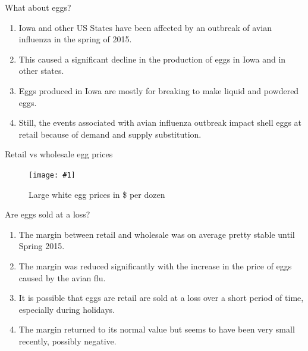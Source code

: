 \documentclass[table,xcolor=pdftex,dvipsnames, handout]{beamer}\usepackage[]{graphicx}\usepackage[]{color}
\newcommand {\framedgraphic}[1] {
        \begin{center}
            \texttt{[image: \#1]}
        \end{center}
        \vspace{-1\baselineskip}
}
\begin{document}

\begin{frame}{What about eggs?}
\begin{enumerate}[label=\textbullet]
  \item Iowa and other US States have been affected by an outbreak of avian influenza in the spring of 2015.
  \item This caused a significant decline in the production of eggs in Iowa and in other states.
  \item Eggs produced in Iowa are mostly for breaking to make liquid and powdered eggs.
  \item Still, the events associated with avian influenza outbreak impact shell eggs at retail because of demand and supply substitution.
\end{enumerate}
\end{frame}


\begin{frame}{Retail vs wholesale egg prices}
\begin{figure}[htbp]
\caption{Large white egg prices in \$ per dozen}
    \framedgraphic{Egg_retail_wholesale.png}
\end{figure}
\end{frame}


\begin{frame}{Are eggs sold at a loss?}
\begin{enumerate}[label=\textbullet]
  \item The margin between retail and wholesale was on average pretty stable until Spring 2015.
  \item The margin was reduced significantly with the increase in the price of eggs caused by the avian flu.
  \item It is possible that eggs are retail are sold at a loss over a short period of time, especially during holidays.
  \item The margin returned to its normal value but seems to have been very small recently, possibly negative.
\end{enumerate}
\end{frame}


\end{document}
